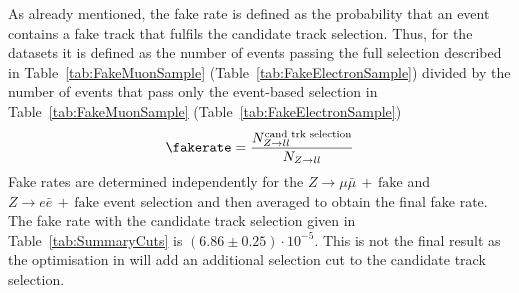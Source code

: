 As already mentioned, the fake rate is defined as the probability that an event contains a fake track that fulfils the candidate track selection.
Thus, for the \Zlep datasets it is defined as the number of events passing the full selection described in Table~\ref{tab:FakeMuonSample} (Table~\ref{tab:FakeElectronSample}) divided by the number of events that pass only the event-based selection in Table~\ref{tab:FakeMuonSample} (Table~\ref{tab:FakeElectronSample})
\begin{equation*}
\fakerate = \frac{N_{Z\rightarrow ll}^{\text{cand trk selection}}}{N_{Z\rightarrow ll}}
\end{equation*}
Fake rates are determined independently for the $Z\rightarrow \mu\bar{\mu}\,+\,\text{fake}$ and $Z\rightarrow e\bar{e}\,+\,\text{fake}$ event selection and then averaged to obtain the final fake rate. 
The fake rate with the candidate track selection given in Table~\ref{tab:SummaryCuts} is $\left( 6.86 \pm 0.25 \right) \cdot 10^{-5}$. 
This is not the final result as the optimisation in \pt will add an additional \pt selection cut to the candidate track selection.


